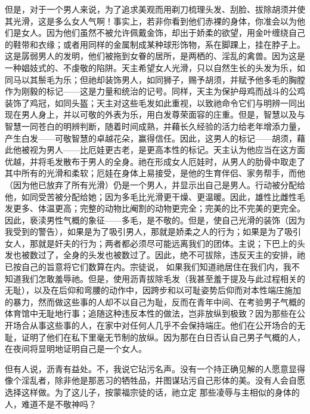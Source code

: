 但是，对于一个男人来说，为了追求美观而用剃刀梳理头发、刮脸、拔除胡须并使其光滑，这是多么女人气啊！事实上，若非你看到他们赤裸的身体，你准会以为他们是女人。因为他们虽然不被允许佩戴金饰，却出于娇柔的欲望，用金叶缠绕自己的鞋带和衣缘；或者用同样的金属制成某种球形饰物，系在脚踝上，挂在脖子上。这是孱弱男人的发明，他们被拖到女眷的居所，是两栖的、淫乱的禽兽。因为这是一种娼妓式的、不虔敬的陷阱。天主希望女人光滑，只以自然生长的头发为乐，如同马以其鬃毛为乐；但祂却装饰男人，如同狮子，赐予胡须，并赋予他多毛的胸膛作为刚毅的标记——这是力量和统治的记号。同样，天主为保护母鸡而战斗的公鸡装饰了鸡冠，如同头盔；天主对这些毛发如此重视，以致祂命令它们与明辨一同出现在男人身上，并以可敬的外表为乐，用白发尊荣面容的庄重。但是，智慧以及与智慧一同苍白的明辨判断，随着时间成熟，并藉长久经验的活力给老年增添力量，产生白发——可敬智慧的卓越花朵，赢得信任。因此，这男人的标记——胡须，藉此他被视为男人——比厄娃更古老，是更高本性的标记。天主认为他应当在这方面优越，并将毛发散布于男人的全身。祂在形成女人厄娃时，从男人的肋骨中取走了其中所有的光滑和柔软；厄娃在身体上易接受，是他的生育伴侣、家务帮手，而他（因为他已放弃了所有光滑）仍是一个男人，并显示出自己是男人。行动被分配给他，如同受苦被分配给她；因为多毛比光滑更干燥、更温暖。因此，雄性比雌性毛发更多、体温更高；完整的动物比阉割的动物更完全；完美的比不完美的更完全。因此，亵渎男性气概的象征——多毛，是不敬的。但是，使自己光滑的装饰（因为我受到的警告），如果是为了吸引男人，那就是娇柔之人的行为；如果是为了吸引女人，那就是奸夫的行为；两者都必须尽可能远离我们的团体。主说；下巴上的头发也被数过了，全身的头发也被数过了。因此，绝不可拔除，违反天主的安排，祂已按自己的旨意将它们数算在内。宗徒说， 如果我们知道祂居住在我们内，我不知道我们怎敢羞辱祂。但是，使用沥青拔除毛发（我甚至羞于提及与此过程相关的无耻），以及在后仰和弯腰的动作中，因跨步和以可耻姿势后仰而对本性端庄施加的暴力，然而做这些事的人却不以自己为耻，反而在青年中间、在考验男子气概的体育馆中无耻地行事；追随这种违反本性的做法，岂非放纵到极致？因为那些在公开场合从事这些事的人，在家中对任何人几乎不会保持端庄。他们在公开场合的无耻，证明了他们在私下里毫无节制的放纵。因为那在白日否认自己男子气概的人，在夜间将显明地证明自己是一个女人。 \par

但有人说，沥青有益处。不，我说它玷污名声。没有一个持正确见解的人愿意显得像个淫乱者，除非他是那恶习的牺牲品，并图谋玷污自己形体的美。没有人会自愿选择这样做。为了这儿子，按蒙福宗徒的话，祂立定 那些凌辱与主相似的身体的人，难道不是不敬神吗？\par

